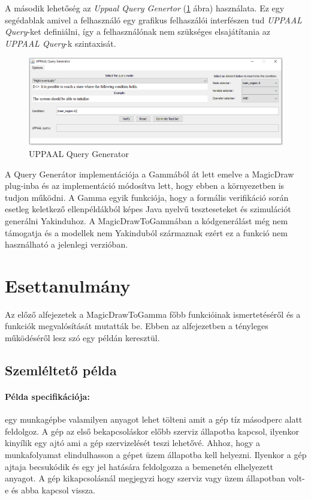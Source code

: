 A második lehetőség az \emph{Uppaal Query Genertor} (\ref{fig:upp-query-gen} ábra) használata. Ez egy segédablak amivel a felhasználó egy grafikus felhaszálói interfészen tud \emph{UPPAAL Query}-ket definiálni, így a felhasználónak nem szükséges elsajátítania az \emph{UPPAAL Query}-k szintaxisát.

\begin{figure}[!ht]
	\centering
	\includegraphics[keepaspectratio, width=150mm]{figures/query-gen.png}
	\caption{UPPAAL Query Generator}
	\label{fig:upp-query-gen}
\end{figure}

A Query Generátor implementációja a Gammából át lett emelve a MagicDraw plug-inba és az implementáció módosítva lett, hogy ebben a környezetben is tudjon működni. A Gamma egyik funkciója, hogy a formális verifikáció során esetleg keletkező ellenpéldákból képes Java nyelvű teszteseteket és szimulációt generálni Yakinduhoz. A MagicDrawToGammában a kódgenerálást még nem támogatja és a modellek nem Yakinduból származnak ezért ez a funkció nem használható a jelenlegi verzióban.

\section{Esettanulmány}

Az előző alfejezetek a MagicDrawToGamma főbb funkcióinak ismertetéséről és a funkciók megvalósítását mutatták be. Ebben az alfejezetben a  tényleges működéséről lesz szó egy példán keresztül.

\subsection{Szemléltető példa}

\paragraph{Példa specifikációja:} egy munkagépbe valamilyen anyagot lehet tölteni amit a gép tíz másodperc alatt feldolgoz. A gép az első bekapcsoláskor előbb szerviz állapotba kapcsol, ilyenkor kinyílik egy ajtó ami a gép szervizelését teszi lehetővé. Ahhoz, hogy a munkafolyamat elindulhasson a gépet üzem állapotba kell helyezni. Ilyenkor a gép ajtaja becsukódik és egy jel hatására feldolgozza a bemenetén elhelyezett anyagot. A gép kikapcsolásnál megjegyzi hogy szerviz vagy üzem állapotban volt-e és abba kapcsol vissza.

